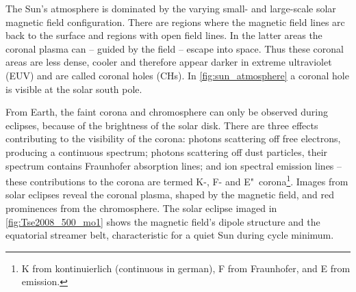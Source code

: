 The Sun's atmosphere is dominated by the varying small- and large-scale solar magnetic field configuration. There are regions where the magnetic field lines arc back to the surface and regions with open field lines. In the latter areas the coronal plasma can -- guided by the field -- escape into space. Thus these coronal areas are less dense, cooler and therefore appear darker in extreme ultraviolet (EUV) and are called coronal holes (CHs). In \autoref{fig:sun_atmosphere} a coronal hole is visible at the solar south pole.

From Earth, the faint corona and chromosphere can only be observed during eclipses, because of the brightness of the solar disk. There are three effects contributing to the visibility of the corona: photons scattering off free electrons, producing a continuous spectrum; photons scattering off dust particles, their spectrum contains Fraunhofer absorption lines; and ion spectral emission lines -- these contributions to the corona are termed K-, F- and E"~corona\footnote{K from kontinuierlich (continuous in german), F from Fraunhofer, and E from emission.}.
Images from solar eclipses reveal the coronal plasma, shaped by the magnetic field, and red prominences from the chromosphere. The solar eclipse imaged in \autoref{fig:Tse2008_500_mo1} shows the magnetic field's dipole structure and the equatorial streamer belt, characteristic for a quiet Sun during cycle minimum.
